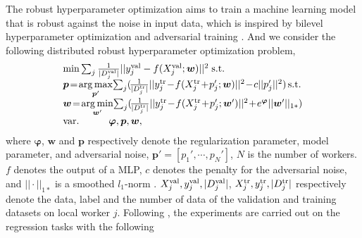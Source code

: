 \documentclass[letterpaper]{article} %
\begin{document}
The robust hyperparameter optimization \cite{sato2021gradient} aims to train a machine learning model that is robust against the noise in input data, which is inspired by bilevel hyperparameter optimization \cite{chen2022single} and adversarial training \cite{han2023fedal,zhang2022revisiting}. And we consider the following distributed robust hyperparameter optimization problem,
\begin{equation}
\begin{array}{l}
\mathop {\min }\sum\nolimits_{j} \frac{1}{|D^{\rm{val}}_j|}|| y^{\rm{val}}_j - f(X^{\rm{val}}_j;{\boldsymbol{w}})||^2 \;{\mathop{\rm s.t.}} \\

 {\boldsymbol{p}} \!=\! \mathop {\arg \max } \limits_{{\boldsymbol{p}}'} \! \sum\nolimits_{j} (\! \frac{1}{{|D^{\rm{tr}}_j|}} ||y^{\rm{tr}}_j\! -\! f(X^{\rm{tr}}_j\! +\! {p_j'} ;{\boldsymbol{w}}) ||^2 \! -\! c||{p_j'} ||^2) \,{\mathop{\rm s.t.}}\\

 {\boldsymbol{w}} \!=\! \mathop {\arg \min }\limits_{{\boldsymbol{w}}'}\!\sum\nolimits_{j}(\! \frac{1}{{|D^{\rm{tr}}_j|}} ||y^{\rm{tr}}_j\! -\! f(X^{\rm{tr}}_j \!+\! {p_j'} ;{\boldsymbol{w}}') ||^2  \!+\! e^{{\boldsymbol{\varphi }}} ||{\boldsymbol{w}}'||_{1*})  \\
{\mathop{\rm var.}} \qquad \quad {\boldsymbol{\varphi }} ,{\boldsymbol{p}},{\boldsymbol{w}},
\end{array}
\end{equation}
where ${\boldsymbol{\varphi }}$, ${\boldsymbol{w }}$ and ${\boldsymbol{p}}$ respectively denote the regularization parameter, model parameter, and adversarial noise,   ${\boldsymbol{p}}'=[p_1',\cdots,p_N']$, $N$ is the number of workers. $f$ denotes the output of a MLP, $c$ denotes the penalty for the adversarial noise, and $|| \cdot ||_{1*}$ is a  smoothed $l_1$-norm \cite{saheya2019neural}. $X^{\rm{val}}_j, y^{\rm{val}}_j, {|D^{\rm{val}}_j|}$, $X^{\rm{tr}}_j, y^{\rm{tr}}_j, {|D^{\rm{tr}}_j|}$ respectively denote the data, label and the number of data of the validation and training datasets on local worker $j$. Following \cite{sato2021gradient}, the experiments are carried out on the regression tasks with the following
\end{document}
